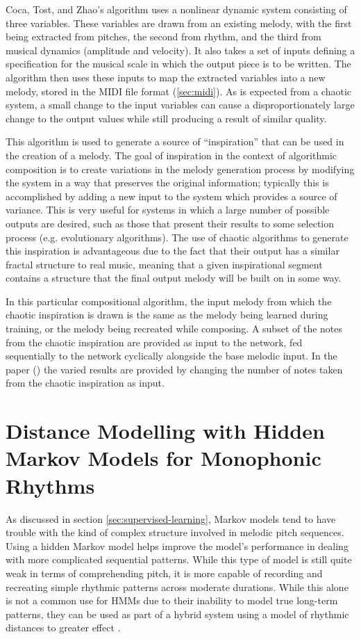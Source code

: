 \documentclass[ author={Stephen Livermore-Tozer},
				supervisor={Dr. Peter Flach},
				degree={MEng},
				title={Algorithmic Co-composition Using Machine Learning},
				subtitle={},
				type={research},
				year={2016} ]{dissertation}
\begin{document}
	Coca, Tost, and Zhao's algorithm uses a nonlinear dynamic system consisting of three variables. These variables are drawn from an existing melody, with the first being extracted from pitches, the second from rhythm, and the third from musical dynamics (amplitude and velocity). It also takes a set of inputs defining a specification for the musical scale in which the output piece is to be written. The algorithm then uses these inputs to map the extracted variables into a new melody, stored in the MIDI file format (\ref{sec:midi}). As is expected from a chaotic system, a small change to the input variables can cause a disproportionately large change to the output values while still producing a result of similar quality.
	
	This algorithm is used to generate a source of ``inspiration'' that can be used in the creation of a melody. The goal of inspiration in the context of algorithmic composition is to create variations in the melody generation process by modifying the system in a way that preserves the original information; typically this is accomplished by adding a new input to the system which provides a source of variance. This is very useful for systems in which a large number of possible outputs are desired, such as those that present their results to some selection process (e.g. evolutionary algorithms). The use of chaotic algorithms to generate this inspiration is advantageous due to the fact that their output has a similar fractal structure to real music, meaning that a given inspirational segment contains a structure that the final output melody will be built on in some way.
	
	In this particular compositional algorithm, the input melody from which the chaotic inspiration is drawn is the same as the melody being learned during training, or the melody being recreated while composing. A subset of the notes from the chaotic inspiration are provided as input to the network, fed sequentially to the network cyclically alongside the base melodic input. In the paper (\cite{coca2011generation}) the varied results are provided by changing the number of notes taken from the chaotic inspiration as input.
	
	\section{Distance Modelling with Hidden Markov Models for Monophonic Rhythms}
	\label{sec:distance-model}
	
	As discussed in section \ref{sec:supervised-learning}, Markov models tend to have trouble with the kind of complex structure involved in melodic pitch sequences. Using a hidden Markov model helps improve the model's performance in dealing with more complicated sequential patterns. While this type of model is still quite weak in terms of comprehending pitch, it is more capable of recording and recreating simple rhythmic patterns across moderate durations. While this alone is not a common use for HMMs due to their inability to model true long-term patterns, they can be used as part of a hybrid system using a model of rhythmic distances to greater effect \cite{paiement2007generative}.
	
\end{document}
